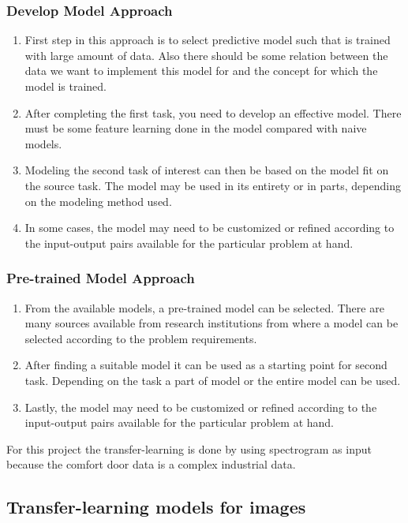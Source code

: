     \subsubsection{Develop Model Approach}
    \begin{enumerate}
    	\item First step in this approach is to select predictive model such that is trained with large amount of data. Also there should be some relation between the data we want to implement this model for and the concept for which the model is trained.
    	\item After completing the first task, you need to develop an effective model. There must be some feature learning done in the model compared with naive models.
    	\item Modeling the second task of interest can then be based on the model fit on the source task. The model may be used in its entirety or in parts, depending on the modeling method used.
    	\item  In some cases, the model may need to be customized or refined according to the input-output pairs available for the particular problem at hand.
    \end{enumerate}
    \subsubsection{Pre-trained Model Approach}
     \begin{enumerate}
     	\item From the available models, a pre-trained model can be selected. There are many sources available from research institutions from where a model can be selected according to the problem requirements.
     	\item After finding a suitable model it can be used as a starting point for second task. Depending on the task a part of model or the entire model can be used.
     
     	\item  Lastly, the model may need to be customized or refined according to the input-output pairs available for the particular problem at hand.
     \end{enumerate}
    
    For this project the transfer-learning is done by using spectrogram as input because the comfort door data is a complex industrial data.
    
    \subsection{Transfer-learning models for images}
   
